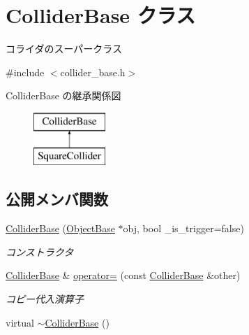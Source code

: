 \hypertarget{class_collider_base}{}\section{Collider\+Base クラス}
\label{class_collider_base}


コライダのスーパークラス  




{\ttfamily \#include $<$collider\+\_\+base.\+h$>$}

Collider\+Base の継承関係図\begin{figure}[H]
\begin{center}
\leavevmode
\includegraphics[height=2.000000cm]{class_collider_base}
\end{center}
\end{figure}
\subsection*{公開メンバ関数}
\begin{DoxyCompactItemize}
\item 
\mbox{\hyperlink{class_collider_base_a61d7057a7e05549088f2b15c1e525858}{Collider\+Base}} (\mbox{\hyperlink{class_object_base}{Object\+Base}} $\ast$obj, bool \+\_\+is\+\_\+trigger=false)
\begin{DoxyCompactList}\small\item\em コンストラクタ \end{DoxyCompactList}\item 
\mbox{\hyperlink{class_collider_base}{Collider\+Base}} \& \mbox{\hyperlink{class_collider_base_a2bc4d08eb29126c0cb0ea45b06517328}{operator=}} (const \mbox{\hyperlink{class_collider_base}{Collider\+Base}} \&other)
\begin{DoxyCompactList}\small\item\em コピー代入演算子 \end{DoxyCompactList}\item 
virtual \mbox{\hyperlink{class_collider_base_a485c8a6348a053228aa61142a71e48fb}{$\sim$\+Collider\+Base}} ()
\end{DoxyCompactItemize}
